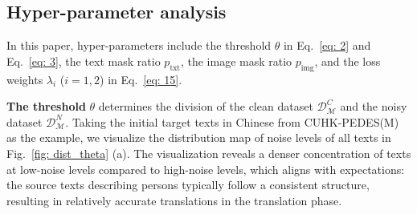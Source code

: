 \documentclass[10pt,journal,compsoc]{IEEEtran}
\begin{document}


\subsection{Hyper-parameter analysis}
In this paper, hyper-parameters include the threshold \(\theta\) in Eq.~\eqref{eq: 2} and Eq.~\eqref{eq: 3}, the text mask ratio \(p_{\text{txt}}\), the image mask ratio \(p_{\text{img}}\), and the loss weights \(\lambda_i\) (\(i = 1, 2\)) in Eq.~\eqref{eq: 15}. 

\textbf{The threshold} \(\theta\) determines the division of the clean dataset \(\mathcal{D}^C_{\mathcal{M}}\) and the noisy dataset \(\mathcal{D}^N_{\mathcal{M}}\). 
Taking the initial target texts in Chinese from CUHK-PEDES(M) as the example, we visualize the distribution map of noise levels of all texts in Fig.~\ref{fig: dist_theta} (a). The visualization reveals a denser concentration of texts at low-noise levels compared to high-noise levels, which aligns with expectations: the source texts describing persons typically follow a consistent structure, resulting in relatively accurate translations in the translation phase.
\end{document}
